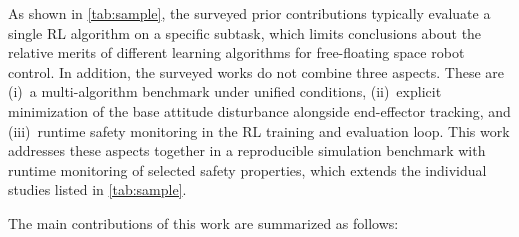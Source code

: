 \documentclass{ieeeaccess}
\begin{document}
As shown in \cref{tab:sample}, the surveyed prior contributions typically evaluate a single RL algorithm
on a specific subtask, which limits conclusions about the relative merits of different learning
algorithms for free-floating space robot control. In addition, the surveyed works do not combine three
aspects. These are (i)~a multi-algorithm benchmark under unified conditions, (ii)~explicit minimization
of the base attitude disturbance alongside end-effector tracking, and (iii)~runtime safety monitoring in
the RL training and evaluation loop. This work addresses these aspects together in a reproducible
simulation benchmark with runtime monitoring of selected safety properties, which extends the individual
studies listed in \cref{tab:sample}.

The main contributions of this work are summarized as follows:
\end{document}
